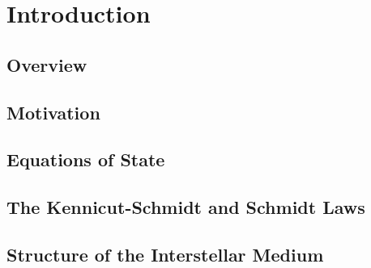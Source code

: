 \chapter{Introduction}\label{sec:introduction}

\section{Overview}


\section{Motivation}


\section{Equations of State}


\section{The Kennicut-Schmidt and Schmidt Laws}


\section{Structure of the Interstellar Medium}

